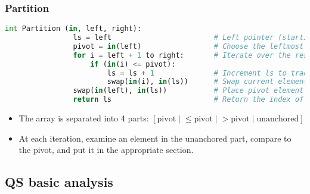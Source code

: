     \begin{intuition}
    \end{intuition}

    \subsubsection{Partition}
    \begin{definition}
        \begin{lstlisting}[language=Python, caption={Partition Function Pseudocode with Comments}]
            int Partition (in, left, right):
                ls = left                        # Left pointer (starting index)
                pivot = in(left)                 # Choose the leftmost element as the pivot
                for i = left + 1 to right:       # Iterate over the rest of the elements
                    if (in(i) <= pivot):         
                        ls = ls + 1              # Increment ls to track smaller elements
                        swap(in(i), in(ls))      # Swap current element with the element at ls
                swap(in(left), in(ls))           # Place pivot element in correct position
                return ls                        # Return the index of the pivot
        \end{lstlisting}


    \end{definition}

    \begin{intuition}
        \begin{itemize}
            \item The array is separated into 4 parts: $[\text{pivot} \; | \; \leq \text{pivot} \; | \; > \text{pivot} \; | \; \text{unanchored}]$
            \item At each iteration, examine an element in the unanchored part, compare to the pivot, and put it in the appropriate section.
        \end{itemize}
    \end{intuition}

\subsection{QS basic analysis}
